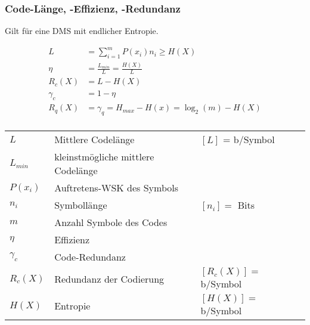 \subsubsection{Code-Länge, -Effizienz, -Redundanz }
Gilt für eine DMS mit endlicher Entropie.
\begin{multicols}{2}
	\abovedisplayskip=-15pt %
	\begin{align*}
		L 		 &= \sum\limits_{i=1}^m P(x_i) n_i \geq H(X)\\
		\eta	 & = \frac{L_{min}}{L} = \frac{H(X)}{L}  \\
		R_c(X) &  = L - H(X) \\
		\gamma_c &  = 1-\eta \\
		R_q(X)	 &= \gamma_q = H_{max} - H(x) = \log_2(m) - H(X) \\
	\end{align*}
	
	\begin{tabular}{lll}
		$L$ 		& Mittlere Codelänge & $[L]$ = b/Symbol \\
		$L_{min}$ 	& kleinstmögliche mittlere Codelänge &  \\
		$P(x_i)$	& Auftretens-WSK des Symbols \\
		$n_i$ 		& Symbollänge & $[n_i] = $ Bits \\
		$m$ 		& Anzahl Symbole des Codes \\
		$\eta$ 		& Effizienz \\
		$\gamma_c$  & Code-Redundanz  & \\
		$R_c(X)$    & Redundanz der Codierung & $[R_c(X)] = $ b/Symbol\\
		$H(X)$ 		& Entropie &  $[H(X)] = $ b/Symbol 
	\end{tabular}
\end{multicols}

